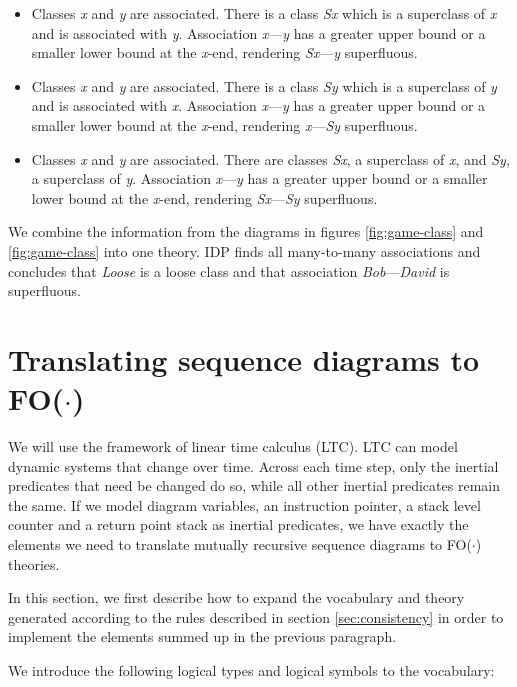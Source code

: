 \documentclass[conference]{IEEEtran}
\begin{document}
\begin{itemize}
	\item Classes \textit{x} and \textit{y} are associated. There is a class \textit{Sx} which is a superclass of \textit{x} and is associated with \textit{y}. Association \textit{x}---\textit{y} has a greater upper bound or a smaller lower bound at the \textit{x}-end, rendering \textit{Sx}---\textit{y} superfluous.
	\item Classes \textit{x} and \textit{y} are associated. There is a class \textit{Sy} which is a superclass of \textit{y} and is associated with \textit{x}. Association \textit{x}---\textit{y} has a greater upper bound or a smaller lower bound at the \textit{x}-end, rendering \textit{x}---\textit{Sy} superfluous.
	\item Classes \textit{x} and \textit{y} are associated. There are classes \textit{Sx}, a superclass of \textit{x}, and \textit{Sy}, a superclass of \textit{y}. Association \textit{x}---\textit{y} has a greater upper bound or a smaller lower bound at the \textit{x}-end, rendering \textit{Sx}---\textit{Sy} superfluous. 
\end{itemize}

We combine the information from the diagrams in figures \ref{fig:game-class} and \ref{fig:game-class} into one theory. IDP finds all many-to-many associations and concludes that \textit{Loose} is a loose class and that association \textit{Bob}---\textit{David} is superfluous.

\section{Translating sequence diagrams to FO($\cdot$)}\label{sec:seq}
We will use the framework of linear time calculus\cite{BogaertsBart2014Sdsu} (LTC). LTC can model dynamic systems that change over time. Across each time step, only the inertial predicates that need be changed do so, while all other inertial predicates remain the same. If we model diagram variables, an instruction pointer, a stack level counter and a return point stack as inertial predicates, we have exactly the elements we need to translate mutually recursive sequence diagrams to FO($\cdot$) theories.

In this section, we first describe how to expand the vocabulary and theory generated according to the rules described in section \ref{sec:consistency} in order to implement the elements summed up in the previous paragraph.

We introduce the following logical types and logical symbols to the vocabulary:
\end{document}
